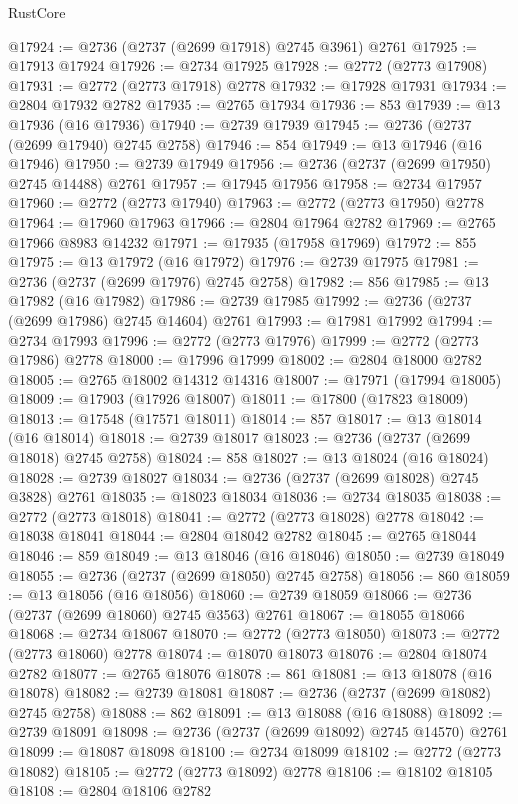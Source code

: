 \begin{lexlean}{RustCore}
\begin{coremodule}
@17924 := @2736 (@2737 (@2699 @17918) @2745 @3961) @2761
@17925 := @17913 @17924
@17926 := @2734 @17925
@17928 := @2772 (@2773 @17908)
@17931 := @2772 (@2773 @17918) @2778
@17932 := @17928 @17931
@17934 := @2804 @17932 @2782
@17935 := @2765 @17934
@17936 := 853
@17939 := @13 @17936 (@16 @17936)
@17940 := @2739 @17939
@17945 := @2736 (@2737 (@2699 @17940) @2745 @2758)
@17946 := 854
@17949 := @13 @17946 (@16 @17946)
@17950 := @2739 @17949
@17956 := @2736 (@2737 (@2699 @17950) @2745 @14488) @2761
@17957 := @17945 @17956
@17958 := @2734 @17957
@17960 := @2772 (@2773 @17940)
@17963 := @2772 (@2773 @17950) @2778
@17964 := @17960 @17963
@17966 := @2804 @17964 @2782
@17969 := @2765 @17966 @8983 @14232
@17971 := @17935 (@17958 @17969)
@17972 := 855
@17975 := @13 @17972 (@16 @17972)
@17976 := @2739 @17975
@17981 := @2736 (@2737 (@2699 @17976) @2745 @2758)
@17982 := 856
@17985 := @13 @17982 (@16 @17982)
@17986 := @2739 @17985
@17992 := @2736 (@2737 (@2699 @17986) @2745 @14604) @2761
@17993 := @17981 @17992
@17994 := @2734 @17993
@17996 := @2772 (@2773 @17976)
@17999 := @2772 (@2773 @17986) @2778
@18000 := @17996 @17999
@18002 := @2804 @18000 @2782
@18005 := @2765 @18002 @14312 @14316
@18007 := @17971 (@17994 @18005)
@18009 := @17903 (@17926 @18007)
@18011 := @17800 (@17823 @18009)
@18013 := @17548 (@17571 @18011)
@18014 := 857
@18017 := @13 @18014 (@16 @18014)
@18018 := @2739 @18017
@18023 := @2736 (@2737 (@2699 @18018) @2745 @2758)
@18024 := 858
@18027 := @13 @18024 (@16 @18024)
@18028 := @2739 @18027
@18034 := @2736 (@2737 (@2699 @18028) @2745 @3828) @2761
@18035 := @18023 @18034
@18036 := @2734 @18035
@18038 := @2772 (@2773 @18018)
@18041 := @2772 (@2773 @18028) @2778
@18042 := @18038 @18041
@18044 := @2804 @18042 @2782
@18045 := @2765 @18044
@18046 := 859
@18049 := @13 @18046 (@16 @18046)
@18050 := @2739 @18049
@18055 := @2736 (@2737 (@2699 @18050) @2745 @2758)
@18056 := 860
@18059 := @13 @18056 (@16 @18056)
@18060 := @2739 @18059
@18066 := @2736 (@2737 (@2699 @18060) @2745 @3563) @2761
@18067 := @18055 @18066
@18068 := @2734 @18067
@18070 := @2772 (@2773 @18050)
@18073 := @2772 (@2773 @18060) @2778
@18074 := @18070 @18073
@18076 := @2804 @18074 @2782
@18077 := @2765 @18076
@18078 := 861
@18081 := @13 @18078 (@16 @18078)
@18082 := @2739 @18081
@18087 := @2736 (@2737 (@2699 @18082) @2745 @2758)
@18088 := 862
@18091 := @13 @18088 (@16 @18088)
@18092 := @2739 @18091
@18098 := @2736 (@2737 (@2699 @18092) @2745 @14570) @2761
@18099 := @18087 @18098
@18100 := @2734 @18099
@18102 := @2772 (@2773 @18082)
@18105 := @2772 (@2773 @18092) @2778
@18106 := @18102 @18105
@18108 := @2804 @18106 @2782

\end{coremodule}
\end{lexlean}
